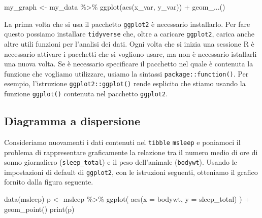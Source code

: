 \documentclass[
  10pt,
  italian,
  a4paper,
  extrafontsizes,onecolumn,openright
  ]{memoir}
\newenvironment{Shaded}{\begin{snugshade}}{\end{snugshade}}
\newcommand{\AttributeTok}[1]{\textcolor[rgb]{0.77,0.63,0.00}{#1}}
\newcommand{\FunctionTok}[1]{\textcolor[rgb]{0.00,0.00,0.00}{#1}}
\newcommand{\NormalTok}[1]{#1}
\newcommand{\OtherTok}[1]{\textcolor[rgb]{0.56,0.35,0.01}{#1}}
\newcommand{\SpecialCharTok}[1]{\textcolor[rgb]{0.00,0.00,0.00}{#1}}
\begin{document}
\begin{Shaded}
\begin{Highlighting}[]
\NormalTok{my\_graph }\OtherTok{\textless{}{-}}\NormalTok{ my\_data }\SpecialCharTok{\%\textgreater{}\%} 
  \FunctionTok{ggplot}\NormalTok{(}\FunctionTok{aes}\NormalTok{(x\_var, y\_var)) }\SpecialCharTok{+}
  \FunctionTok{geom\_...}\NormalTok{()}
\end{Highlighting}
\end{Shaded}

La prima volta che si usa il pacchetto \texttt{ggplot2} è necessario installarlo. Per fare questo possiamo installare \texttt{tidyverse} che, oltre a caricare \texttt{ggplot2}, carica anche altre utili funzioni per l'analisi dei dati. Ogni volta che si inizia una sessione R è necessario attivare i pacchetti che si vogliono usare, ma non è necessario istallarli una nuova volta. Se è necessario specificare il pacchetto nel quale è contenuta la funzione che vogliamo utilizzare, usiamo la sintassi \texttt{package::function()}. Per esempio, l'istruzione \texttt{ggplot2::ggplot()} rende esplicito che stiamo usando la funzione \texttt{ggplot()} contenuta nel pacchetto \texttt{ggplot2}.

\hypertarget{diagramma-a-dispersione}{%
\subsection{Diagramma a dispersione}\label{diagramma-a-dispersione}}

Consideriamo nuovamenti i dati contenuti nel \texttt{tibble} \texttt{msleep} e poniamoci il problema di rappresentare graficamente la relazione tra il numero medio di ore di sonno giornaliero (\texttt{sleep\_total}) e il peso dell'animale (\texttt{bodywt}). Usando le impostazioni di default di \texttt{ggplot2}, con le istruzioni seguenti, otteniamo il grafico fornito dalla figura seguente.

\begin{Shaded}
\begin{Highlighting}[]
\FunctionTok{data}\NormalTok{(msleep)}
\NormalTok{p }\OtherTok{\textless{}{-}}\NormalTok{ msleep }\SpecialCharTok{\%\textgreater{}\%} 
  \FunctionTok{ggplot}\NormalTok{(}
    \FunctionTok{aes}\NormalTok{(}\AttributeTok{x =}\NormalTok{ bodywt, }\AttributeTok{y =}\NormalTok{ sleep\_total)}
\NormalTok{  ) }\SpecialCharTok{+}
  \FunctionTok{geom\_point}\NormalTok{()}
\FunctionTok{print}\NormalTok{(p)}
\end{Highlighting}
\end{Shaded}
\end{document}
